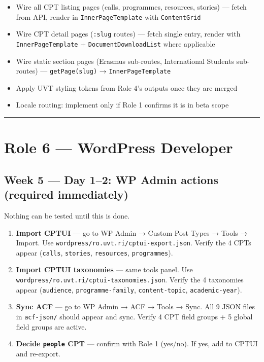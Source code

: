 \documentclass[11pt,a4paper]{article}
\newcommand{\grouprule}{\vspace{0.3em}\textcolor{ruleLine}{\rule{\linewidth}{0.4pt}}\vspace{0.3em}}
\begin{document}
\begin{itemize}
\item Wire all CPT listing pages (calls, programmes, resources, stories) — fetch from API, render in \nolinkurl{InnerPageTemplate} with \nolinkurl{ContentGrid}
\item Wire CPT detail pages (\nolinkurl{:slug} routes) — fetch single entry, render with \nolinkurl{InnerPageTemplate} + \nolinkurl{DocumentDownloadList} where applicable
\item Wire static section pages (Erasmus sub-routes, International Students sub-routes) — \nolinkurl{getPage(slug)} → \nolinkurl{InnerPageTemplate}
\item Apply UVT styling tokens from Role 4's outputs once they are merged
\item Locale routing: implement only if Role 1 confirms it is in beta scope
\end{itemize}

\grouprule

\section{Role 6 — WordPress Developer}

\subsection{Week 5 — Day 1–2: WP Admin actions (required immediately)}

Nothing can be tested until this is done.

\begin{enumerate}
\item \textbf{Import CPTUI} — go to WP Admin → Custom Post Types → Tools → Import. Use \nolinkurl{wordpress/ro.uvt.ri/cptui-export.json}. Verify the 4 CPTs appear (\nolinkurl{calls}, \nolinkurl{stories}, \nolinkurl{resources}, \nolinkurl{programmes}).
\item \textbf{Import CPTUI taxonomies} — same tools panel. Use \nolinkurl{wordpress/ro.uvt.ri/cptui-taxonomies.json}. Verify the 4 taxonomies appear (\nolinkurl{audience}, \nolinkurl{programme-family}, \nolinkurl{content-topic}, \nolinkurl{academic-year}).
\item \textbf{Sync ACF} — go to WP Admin → ACF → Tools → Sync. All 9 JSON files in \nolinkurl{acf-json/} should appear and sync. Verify 4 CPT field groups + 5 global field groups are active.
\item \textbf{Decide \nolinkurl{people} CPT} — confirm with Role 1 (yes/no). If yes, add to CPTUI and re-export.
\end{enumerate}
\end{document}
